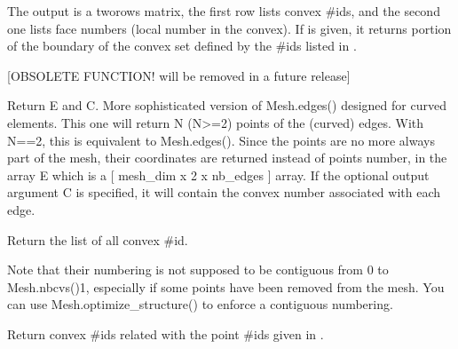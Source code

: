 \documentclass[a4paper,11pt,english]{sphinxmanual}
\begin{document}
\begin{fulllineitems}
\begin{fulllineitems}
The output  is a two\sphinxhyphen{}rows matrix, the first row lists convex
\#ids, and the second one lists face numbers (local number in the
convex). If  is given, it returns portion of the boundary of
the convex set defined by the \#ids listed in .

\end{fulllineitems}


\begin{fulllineitems}
\label{\detokenize{python/cmdref_Mesh:getfem.Mesh.curved_edges}}
{[}OBSOLETE FUNCTION! will be removed in a future release{]}

Return E and C.
More sophisticated version of Mesh.edges() designed for
curved elements. This one will return N (N\textgreater{}=2) points of the
(curved) edges. With N==2, this is equivalent to
Mesh.edges(). Since the points are no more always part of
the mesh, their coordinates are returned instead of points
number, in the array E which is a {[} mesh\_dim x 2 x nb\_edges {]}
array.  If the optional output argument C is specified, it will
contain the convex number associated with each edge.

\end{fulllineitems}


\begin{fulllineitems}
\label{\detokenize{python/cmdref_Mesh:getfem.Mesh.cvid}}
Return the list of all convex \#id.

Note that their numbering is not supposed to be contiguous from
0 to Mesh.nbcvs()\sphinxhyphen{}1,
especially if some points have been removed from the mesh. You
can use Mesh.optimize\_structure() to enforce a contiguous
numbering.

\end{fulllineitems}


\begin{fulllineitems}
\label{\detokenize{python/cmdref_Mesh:getfem.Mesh.cvid_from_pid}}
Return convex \#ids related with the point \#ids given in .


\end{fulllineitems}
\end{fulllineitems}
\end{document}
